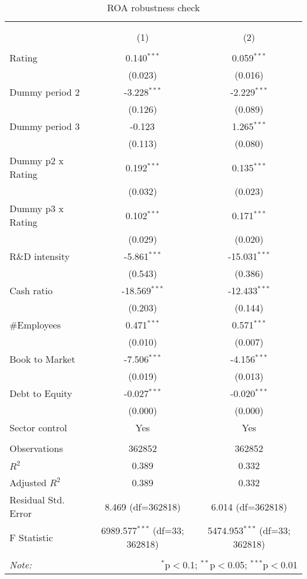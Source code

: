 \begin{table}[!htbp] \centering
  \caption{ROA robustness check}
\begin{tabular}{@{\extracolsep{5pt}}lcc}
\\[-1.8ex]\hline
\hline \\[-1.8ex]
\\[-1.8ex] & (1) & (2) \\
\hline \\[-1.8ex]
 Rating & 0.140$^{***}$ & 0.059$^{***}$ \\
& (0.023) & (0.016) \\
 Dummy period 2 & -3.228$^{***}$ & -2.229$^{***}$ \\
& (0.126) & (0.089) \\
 Dummy period 3 & -0.123$^{}$ & 1.265$^{***}$ \\
& (0.113) & (0.080) \\
 Dummy p2 x Rating & 0.192$^{***}$ & 0.135$^{***}$ \\
& (0.032) & (0.023) \\
 Dummy p3 x Rating & 0.102$^{***}$ & 0.171$^{***}$ \\
& (0.029) & (0.020) \\
 R\&D intensity & -5.861$^{***}$ & -15.031$^{***}$ \\
& (0.543) & (0.386) \\
 Cash ratio & -18.569$^{***}$ & -12.433$^{***}$ \\
& (0.203) & (0.144) \\
 #Employees & 0.471$^{***}$ & 0.571$^{***}$ \\
& (0.010) & (0.007) \\
 Book to Market & -7.506$^{***}$ & -4.156$^{***}$ \\
& (0.019) & (0.013) \\
 Debt to Equity & -0.027$^{***}$ & -0.020$^{***}$ \\
& (0.000) & (0.000) \\
 Sector control & Yes & Yes \\
\hline \\[-1.8ex]
 Observations & 362852 & 362852 \\
 $R^2$ & 0.389 & 0.332 \\
 Adjusted $R^2$ & 0.389 & 0.332 \\
 Residual Std. Error & 8.469 (df=362818) & 6.014 (df=362818) \\
 F Statistic & 6989.577$^{***}$ (df=33; 362818) & 5474.953$^{***}$ (df=33; 362818) \\
\hline
\hline \\[-1.8ex]
\textit{Note:} & \multicolumn{2}{r}{$^{*}$p$<$0.1; $^{**}$p$<$0.05; $^{***}$p$<$0.01} \\
\end{tabular}
\end{table}